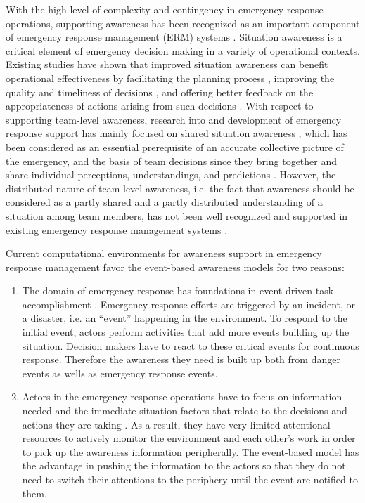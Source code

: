 With the high level of complexity and contingency in emergency response operations, supporting awareness has been recognized as an important component of emergency response management (ERM) systems \cite{Turoff2004}. Situation awareness is a critical element of emergency decision making in a variety of operational contexts. Existing studies have shown that improved situation awareness can benefit operational effectiveness by facilitating the planning process \cite{Javed2011}, improving the quality and timeliness of decisions \cite{Blandford2004}, and offering better feedback on the appropriateness of actions arising from such decisions \cite{Chen2008}. With respect to supporting team-level awareness, research into and development of emergency response support has mainly focused on shared situation awareness \cite{Treurniet2012}, which has been considered as an essential prerequisite of an accurate collective picture of the emergency, and the basis of team decisions since they bring together and share individual perceptions, understandings, and predictions \cite{Javed2011}. However, the distributed nature of team-level awareness, i.e. the fact that awareness should be considered as a partly shared and a partly distributed understanding of a situation among team members, has not been well recognized and supported in existing emergency response management systems \cite{Treurniet2012}.

Current computational environments for awareness support in emergency response management favor the event-based awareness models for two reasons:

\begin{enumerate}
	\item The domain of emergency response has foundations in event driven task accomplishment \cite{Pottebaum2011}. Emergency response efforts are triggered by an incident, or a disaster, i.e. an ``event'' happening in the environment. To respond to the initial event, actors perform activities that add more events building up the situation. Decision makers have to react to these critical events for continuous response. Therefore the awareness they need is built up both from danger events as wells as emergency response events.
	\item Actors in the emergency response operations have to focus on information needed and the immediate situation factors that relate to the decisions and actions they are taking \cite{Turoff2004}. As a result, they have very limited attentional resources to actively monitor the environment and each other's work in order to pick up the awareness information peripherally. The event-based model has the advantage in pushing the information to the actors so that they do not need to switch their attentions to the periphery until the event are notified to them.
\end{enumerate}

